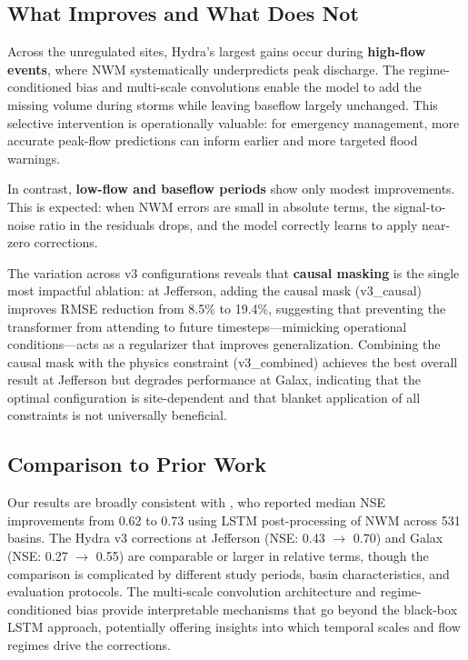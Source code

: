 \documentclass[draft]{agujournal2019}
\begin{document}
\subsection{What Improves and What Does Not}

Across the unregulated sites, Hydra's largest gains occur during \textbf{high-flow events}, where NWM systematically underpredicts peak discharge. The regime-conditioned bias and multi-scale convolutions enable the model to add the missing volume during storms while leaving baseflow largely unchanged. This selective intervention is operationally valuable: for emergency management, more accurate peak-flow predictions can inform earlier and more targeted flood warnings.

In contrast, \textbf{low-flow and baseflow periods} show only modest improvements. This is expected: when NWM errors are small in absolute terms, the signal-to-noise ratio in the residuals drops, and the model correctly learns to apply near-zero corrections.

The variation across v3 configurations reveals that \textbf{causal masking} is the single most impactful ablation: at Jefferson, adding the causal mask (v3\_causal) improves RMSE reduction from 8.5\% to 19.4\%, suggesting that preventing the transformer from attending to future timesteps---mimicking operational conditions---acts as a regularizer that improves generalization. Combining the causal mask with the physics constraint (v3\_combined) achieves the best overall result at Jefferson but degrades performance at Galax, indicating that the optimal configuration is site-dependent and that blanket application of all constraints is not universally beneficial.

\subsection{Comparison to Prior Work}

Our results are broadly consistent with , who reported median NSE improvements from 0.62 to 0.73 using LSTM post-processing of NWM across 531 basins. The Hydra v3 corrections at Jefferson (NSE: 0.43 $\to$ 0.70) and Galax (NSE: 0.27 $\to$ 0.55) are comparable or larger in relative terms, though the comparison is complicated by different study periods, basin characteristics, and evaluation protocols. The multi-scale convolution architecture and regime-conditioned bias provide interpretable mechanisms that go beyond the black-box LSTM approach, potentially offering insights into which temporal scales and flow regimes drive the corrections.
\end{document}
